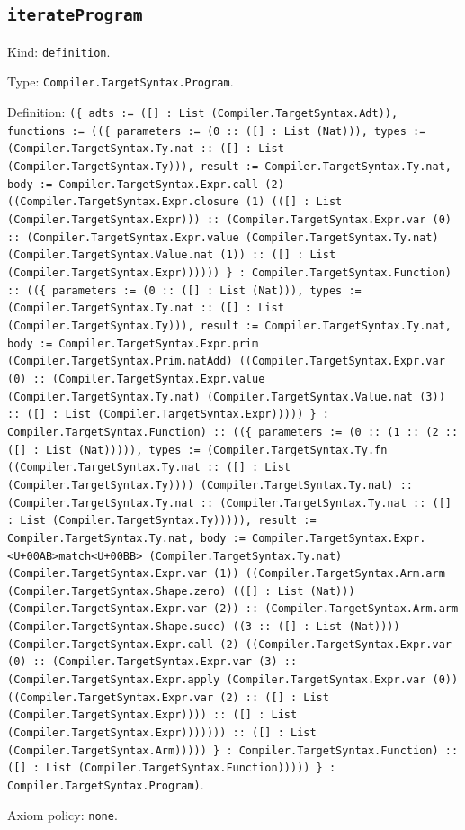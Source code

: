 \documentclass[11pt]{article}
\begin{document}
\subsection*{\texttt{iterateProgram}}
\noindent Kind: \texttt{definition}.\par
\noindent Type: \texttt{Compiler.TargetSyntax.Program}.\par
\noindent Definition: \texttt{(\{ adts := ([] : List (Compiler.TargetSyntax.Adt)), functions := ((\{ parameters := (0 :: ([] : List (Nat))), types := (Compiler.TargetSyntax.Ty.nat :: ([] : List (Compiler.TargetSyntax.Ty))), result := Compiler.TargetSyntax.Ty.nat, body := Compiler.TargetSyntax.Expr.call (2) ((Compiler.TargetSyntax.Expr.closure (1) (([] : List (Compiler.TargetSyntax.Expr))) :: (Compiler.TargetSyntax.Expr.var (0) :: (Compiler.TargetSyntax.Expr.value (Compiler.TargetSyntax.Ty.nat) (Compiler.TargetSyntax.Value.nat (1)) :: ([] : List (Compiler.TargetSyntax.Expr)))))) \} : Compiler.TargetSyntax.Function) :: ((\{ parameters := (0 :: ([] : List (Nat))), types := (Compiler.TargetSyntax.Ty.nat :: ([] : List (Compiler.TargetSyntax.Ty))), result := Compiler.TargetSyntax.Ty.nat, body := Compiler.TargetSyntax.Expr.prim (Compiler.TargetSyntax.Prim.natAdd) ((Compiler.TargetSyntax.Expr.var (0) :: (Compiler.TargetSyntax.Expr.value (Compiler.TargetSyntax.Ty.nat) (Compiler.TargetSyntax.Value.nat (3)) :: ([] : List (Compiler.TargetSyntax.Expr))))) \} : Compiler.TargetSyntax.Function) :: ((\{ parameters := (0 :: (1 :: (2 :: ([] : List (Nat))))), types := (Compiler.TargetSyntax.Ty.fn ((Compiler.TargetSyntax.Ty.nat :: ([] : List (Compiler.TargetSyntax.Ty)))) (Compiler.TargetSyntax.Ty.nat) :: (Compiler.TargetSyntax.Ty.nat :: (Compiler.TargetSyntax.Ty.nat :: ([] : List (Compiler.TargetSyntax.Ty))))), result := Compiler.TargetSyntax.Ty.nat, body := Compiler.TargetSyntax.Expr.<U+00AB>match<U+00BB> (Compiler.TargetSyntax.Ty.nat) (Compiler.TargetSyntax.Expr.var (1)) ((Compiler.TargetSyntax.Arm.arm (Compiler.TargetSyntax.Shape.zero) (([] : List (Nat))) (Compiler.TargetSyntax.Expr.var (2)) :: (Compiler.TargetSyntax.Arm.arm (Compiler.TargetSyntax.Shape.succ) ((3 :: ([] : List (Nat)))) (Compiler.TargetSyntax.Expr.call (2) ((Compiler.TargetSyntax.Expr.var (0) :: (Compiler.TargetSyntax.Expr.var (3) :: (Compiler.TargetSyntax.Expr.apply (Compiler.TargetSyntax.Expr.var (0)) ((Compiler.TargetSyntax.Expr.var (2) :: ([] : List (Compiler.TargetSyntax.Expr)))) :: ([] : List (Compiler.TargetSyntax.Expr))))))) :: ([] : List (Compiler.TargetSyntax.Arm))))) \} : Compiler.TargetSyntax.Function) :: ([] : List (Compiler.TargetSyntax.Function))))) \} : Compiler.TargetSyntax.Program)}.\par
\noindent Axiom policy: \texttt{none}.\par
\end{document}
